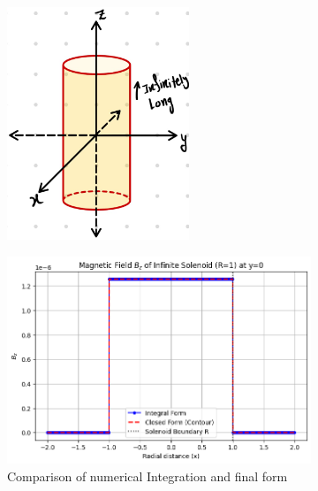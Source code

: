 \documentclass{article}
\begin{document}
\begin{figure}[H]
    \centering
    \begin{subfigure}{0.45\textwidth}
        \includegraphics[width=0.6\textwidth]{Images/infinite_sol1.jpeg}
        \caption{}
        \label{sol_pb1}
    \end{subfigure}
    \hfill
    \begin{subfigure}{0.45\textwidth}
        \includegraphics[width=1\textwidth]{Images/solenoid_plot_py.png}
        \caption{Comparison of numerical Integration and final form}
        \label{sol_com_inf}
    \end{subfigure}
    \caption{}
    \label{fig:sol_inf}
\end{figure}
\end{document}
